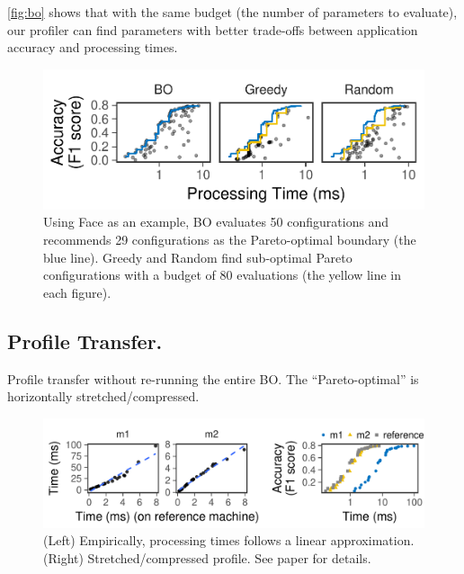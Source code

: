 \autoref{fig:bo} shows that with the same budget (the number of parameters to
evaluate), our profiler can find parameters with better trade-offs between
application accuracy and processing times.

\begin{figure}
  \centering
  \includegraphics[width=0.85\columnwidth]{figures/profiling.pdf}
  \caption{Using Face as an example, BO evaluates 50 configurations and
    recommends 29 configurations as the Pareto-optimal boundary (the blue
    line). Greedy and Random find sub-optimal Pareto configurations with a
    budget of 80 evaluations (the yellow line in each figure).}
  \label{fig:bo}
\end{figure}

\subsection{Profile Transfer.}

Profile transfer without re-running the entire BO. The ``Pareto-optimal'' is
horizontally stretched/compressed.

\blindtext

\begin{figure}
  \centering
  \includegraphics[width=0.9\linewidth]{figures/serving-cross-platform.pdf}
  \caption{(Left) Empirically, processing times follows a linear
    approximation. (Right) Stretched/compressed profile. See paper for
    details.}
\end{figure}

